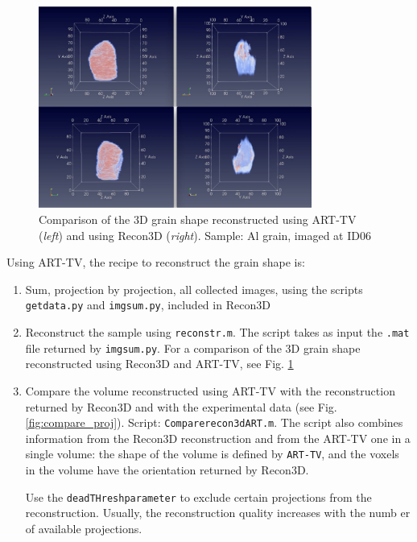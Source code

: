 \documentclass[11pt]{scrartcl}
\begin{document}
\begin{figure}[h]
    \centering
    \includegraphics[width=0.8\textwidth]{Comparison_ART_recon3d.png}
    \caption{Comparison of the 3D grain shape reconstructed using {\footnotesize{ART-TV}} ({\emph{left}}) and using Recon3D ({\emph{right}}). Sample: Al grain, imaged at {\footnotesize{ID06}}}
    \label{fig:vol_ART_recon3d}
\end{figure}

Using {\footnotesize{ART-TV}}, the recipe to reconstruct the grain shape is:
\begin{enumerate}
    \item Sum, projection by projection, all collected images, using the scripts {\texttt{getdata.py}} and {\texttt{img\textunderscore sum.py}}, included in Recon3D
    \item Reconstruct the sample using {\texttt{reconstr.m}}. The script takes as input the {\texttt{.mat}} file returned by {\texttt{img\textunderscore sum.py}}. For a comparison of the {\footnotesize{3D}} grain shape reconstructed using Recon3D and {\footnotesize{ART-TV}}, see Fig. \ref{fig:vol_ART_recon3d}
    \item Compare the volume reconstructed using {\footnotesize{ART-TV}} with the reconstruction returned by Recon3D and with the experimental data (see Fig. \ref{fig:compare_proj}). Script: {\texttt{Compare\textunderscore recon3d\textunderscore ART.m}}. The script also combines information from the Recon3D reconstruction and from the {\footnotesize{ART-TV}} one in a single volume: the shape of the volume is defined by {\texttt{ART-TV}}, and the voxels in the volume have the orientation returned by Recon3D.
    
    Use the {\texttt{deadTHreshparameter}} to exclude certain projections from the reconstruction. Usually, the reconstruction quality increases with the numb er of available projections. 
\end{enumerate}
\end{document}
